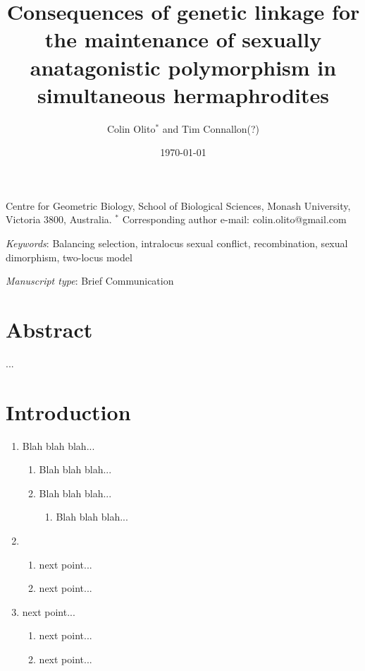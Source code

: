 \documentclass{article}
\title{Consequences of genetic linkage for the maintenance of sexually anatagonistic polymorphism in simultaneous hermaphrodites}
\author{Colin Olito$^{\ast}$ and Tim Connallon(?)}
\date{\today}
\begin{document}
\maketitle


\noindent{} Centre for Geometric Biology, School of Biological Sciences, Monash University, Victoria 3800, Australia.
\noindent{} $^\ast$ Corresponding author e-mail: colin.olito@gmail.com

\bigskip

\noindent{} \textit{Keywords}: Balancing selection, intralocus sexual conflict, recombination, sexual dimorphism, two-locus model

\bigskip

\noindent{} \textit{Manuscript type}: Brief Communication

\bigskip


\linenumbers
\modulolinenumbers[1]
\renewcommand\linenumberfont{\normalfont\small}


\newpage{}
\section*{Abstract}

\noindent{} ...

\newpage{}


\section*{Introduction}

\begin{enumerate}
	\item Blah blah blah...
		\begin{enumerate}
			\item Blah blah blah...
			\item Blah blah blah...
				\begin{enumerate}
					\item Blah blah blah...
				\end{enumerate}
		\end{enumerate}

	\item 
		\begin{enumerate}
			\item next point...
			\item next point...
		\end{enumerate}
	
	\item next point...
		\begin{enumerate}
			\item next point...
			\item next point...
		\end{enumerate}
\end{enumerate}
\end{document}
